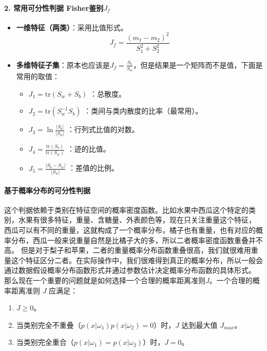 \paragraph{2. 常用可分性判据 Fisher鉴别$J_f$}
\begin{itemize}
    \item \textbf{一维特征（两类）}：采用比值形式。
    \[ J_f = \frac{(m_1 - m_2)^2}{S_1^2 + S_2^2} \]
    \item \textbf{多维特征子集}：原本也应该是$J_f = \frac{S_b}{S_w}$，但是结果是一个矩阵而不是值，下面是常用的取值：
    \begin{itemize}
        \item $J_1 = \text{tr}(S_w + S_b)$ ：总散度。
        \item $J_2 = \text{tr}(S_w^{-1} S_b)$ ：类间与类内散度的比率（最常用）。
        \item $J_3 = \ln \frac{|S_b|}{|S_w|}$ ：行列式比值的对数。
        \item $J_4 = \frac{\text{tr}(S_b)}{\text{tr}(S_w)}$ ：迹的比值。
        \item $J_5 = \frac{|S_b - S_w|}{|S_w|}$ ：差值的比例。
    \end{itemize}
\end{itemize}

\paragraph{基于概率分布的可分性判据}
这个判据依赖于类别在特征空间的概率密度函数。比如水果中西瓜这个特定的类别，水果有很多特征，重量、含糖量、外表颜色等，现在只关注重量这个特征，
西瓜可以有不同的重量，这就构成了一个概率分布，橘子也有重量，也有对应的概率分布，西瓜一般来说重量自然是比橘子大的多，所以二者概率密度函数重叠并不高。
但是对于梨子和苹果，二者的重量概率分布函数重叠很高，我们就很难用重量这个特征区分二者。在实际操作中，我们很难得到真正的概率分布，所以一般会通过数据假设概率分布函数形式并通过参数估计决定概率分布函数的具体形式。
那么现在一个重要的问题就是如何选择一个合理的概率距离准则$J$。一个合理的概率距离准则 $J$ 应满足：
\begin{enumerate}
    \item $J \ge 0$。
    \item 当类别完全不重叠（$p(x|\omega_1)p(x|\omega_2)=0$）时，$J$ 达到最大值 $J_{max}$。
    \item 当类别完全重合（$p(x|\omega_1)=p(x|\omega_2)$）时，$J = 0$。
\end{enumerate}

